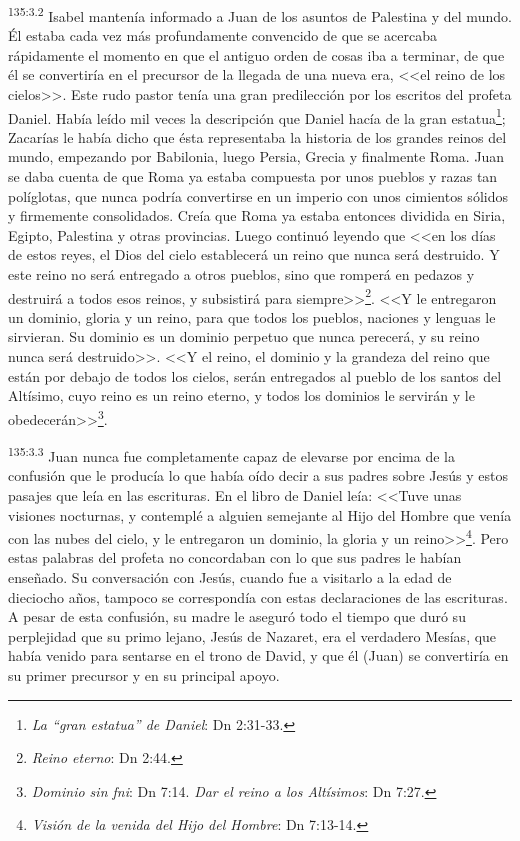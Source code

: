 \par 
\textsuperscript{135:3.2} Isabel mantenía informado a Juan de los asuntos de Palestina y del mundo. Él estaba cada vez más profundamente convencido de que se acercaba rápidamente el momento en que el antiguo orden de cosas iba a terminar, de que él se convertiría en el precursor de la llegada de una nueva era, <<el reino de los cielos>>. Este rudo pastor tenía una gran predilección por los escritos del profeta Daniel. Había leído mil veces la descripción que Daniel hacía de la gran estatua\footnote{\textit{La ``gran estatua'' de Daniel}: Dn 2:31-33.}; Zacarías le había dicho que ésta representaba la historia de los grandes reinos del mundo, empezando por Babilonia, luego Persia, Grecia y finalmente Roma. Juan se daba cuenta de que Roma ya estaba compuesta por unos pueblos y razas tan políglotas, que nunca podría convertirse en un imperio con unos cimientos sólidos y firmemente consolidados. Creía que Roma ya estaba entonces dividida en Siria, Egipto, Palestina y otras provincias. Luego continuó leyendo que <<en los días de estos reyes, el Dios del cielo establecerá un reino que nunca será destruido. Y este reino no será entregado a otros pueblos, sino que romperá en pedazos y destruirá a todos esos reinos, y subsistirá para siempre>>\footnote{\textit{Reino eterno}: Dn 2:44.}. <<Y le entregaron un dominio, gloria y un reino, para que todos los pueblos, naciones y lenguas le sirvieran. Su dominio es un dominio perpetuo que nunca perecerá, y su reino nunca será destruido>>. <<Y el reino, el dominio y la grandeza del reino que están por debajo de todos los cielos, serán entregados al pueblo de los santos del Altísimo, cuyo reino es un reino eterno, y todos los dominios le servirán y le obedecerán>>\footnote{\textit{Dominio sin fni}: Dn 7:14. \textit{Dar el reino a los Altísimos}: Dn 7:27.}.

\par 
\textsuperscript{135:3.3} Juan nunca fue completamente capaz de elevarse por encima de la confusión que le producía lo que había oído decir a sus padres sobre Jesús y estos pasajes que leía en las escrituras. En el libro de Daniel leía: <<Tuve unas visiones nocturnas, y contemplé a alguien semejante al Hijo del Hombre que venía con las nubes del cielo, y le entregaron un dominio, la gloria y un reino>>\footnote{\textit{Visión de la venida del Hijo del Hombre}: Dn 7:13-14.}. Pero estas palabras del profeta no concordaban con lo que sus padres le habían enseñado. Su conversación con Jesús, cuando fue a visitarlo a la edad de dieciocho años, tampoco se correspondía con estas declaraciones de las escrituras. A pesar de esta confusión, su madre le aseguró todo el tiempo que duró su perplejidad que su primo lejano, Jesús de Nazaret, era el verdadero Mesías, que había venido para sentarse en el trono de David, y que él (Juan) se convertiría en su primer precursor y en su principal apoyo.

